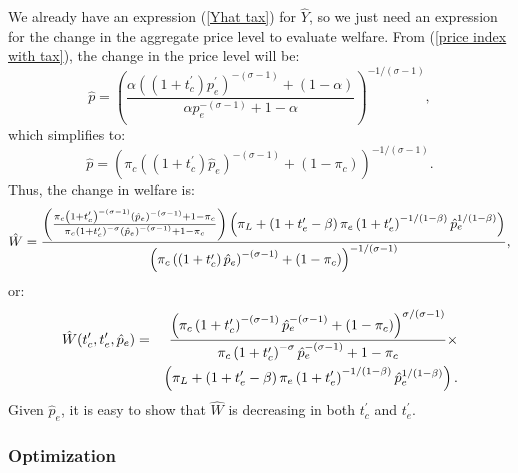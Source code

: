 \documentclass[notitlepage,12pt]{article}
\begin{document}
We already have an expression (\ref{Yhat tax}) for $\hat{Y}$, so we just
need an expression for the change in the aggregate price level to evaluate
welfare. From (\ref{price index with tax}), the change in the price level
will be:%
\begin{equation*}
\hat{p}=\left( \frac{\alpha \left( (1+t_{c}^{\prime })p_{e}^{\prime }\right)
^{-(\sigma -1)}+(1-\alpha )}{\alpha p_{e}^{-(\sigma -1)}+1-\alpha }\right)
^{-1/(\sigma -1)},
\end{equation*}%
which simplifies to: 
\begin{equation*}
\hat{p}=\left( \pi _{c}\left( \left( 1+t_{c}^{\prime }\right) \hat{p}%
_{e}\right) ^{-(\sigma -1)}+(1-\pi _{c})\right) ^{-1/(\sigma -1)}.
\end{equation*}%
Thus, the change in welfare is:%
\begin{equation*}
\hat{W}=\frac{\left( \frac{\pi _{c}\left( 1+t_{c}^{\prime }\right)
^{-(\sigma -1)}\left( \hat{p}_{e}\right) ^{-(\sigma -1)}+1-\pi _{c}}{\pi
_{c}\left( 1+t_{c}^{\prime }\right) ^{-\sigma }\left( \hat{p}_{e}\right)
^{-(\sigma -1)}+1-\pi _{c}}\right) \left( \pi _{L}+\left( 1+t_{e}^{\prime
}-\beta \right) \pi _{e}\left( 1+t_{e}^{\prime }\right) ^{-1/(1-\beta )}\hat{%
p}_{e}^{1/(1-\beta )}\right) }{\left( \pi _{c}\left( \left( 1+t_{c}^{\prime
}\right) \hat{p}_{e}\right) ^{-(\sigma -1)}+(1-\pi _{c})\right) ^{-1/(\sigma
-1)}},
\end{equation*}%
or:%
\begin{eqnarray}
\hat{W}(t_{c}^{\prime },t_{e}^{\prime },\hat{p}_{e}) &=&\frac{\left( \pi
_{c}\left( 1+t_{c}^{\prime }\right) ^{-(\sigma -1)}\hat{p}_{e}^{-(\sigma
-1)}+(1-\pi _{c})\right) ^{\sigma /(\sigma -1)}}{\pi _{c}\left(
1+t_{c}^{\prime }\right) ^{-\sigma }\hat{p}_{e}^{-(\sigma -1)}+1-\pi _{c}}%
\times  \notag \\
&&\left( \pi _{L}+\left( 1+t_{e}^{\prime }-\beta \right) \pi _{e}\left(
1+t_{e}^{\prime }\right) ^{-1/(1-\beta )}\hat{p}_{e}^{1/(1-\beta )}\right) .
\label{What simple}
\end{eqnarray}%
Given $\hat{p}_{e}$, it is easy to show that $\hat{W}$ is decreasing in both 
$t_{c}^{\prime }$ and $t_{e}^{\prime }$.

\subsubsection{Optimization}
\end{document}
